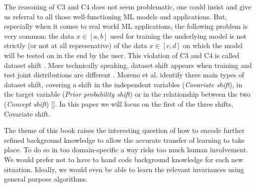 The reasoning of C3 and C4 does not seem problematic, one could insist and give us referral to all those well-functioning ML models and applications. But, especially when it comes to real world ML applications, the following problem is very common: the data $x \in [a,b]$ used for training the underlying model is not strictly (or not at all represenative) of the data $x \in [c,d]$ on which the model will be tested on in the end by the user.  This violation of C3 and C4 is called dataset shift \citep{moreno2012unifying}. More technically speaking, dataset shift appears when training and test joint distributions are different \citep{quionero2009dataset}. Moreno et al. identify three main types of dataset shift, covering a shift in the independent variables (\textit{Covariate shift}), in the target variable (\textit{Prior probability shift}) or in the relationship between the two (\textit{Concept shift}) []. In this paper we will focus on the first of the three shifts, Covariate shift. 



The theme of this book raises the interesting question of how to encode further refined background knowledge to allow the accurate transfer of learning to take place. To do so in too domain-specific a way risks too much human involvement. We would prefer not to have to hand code background knowledge for each new situation. Ideally, we would even be able to learn the relevant invariances using general purpose algorithms.




